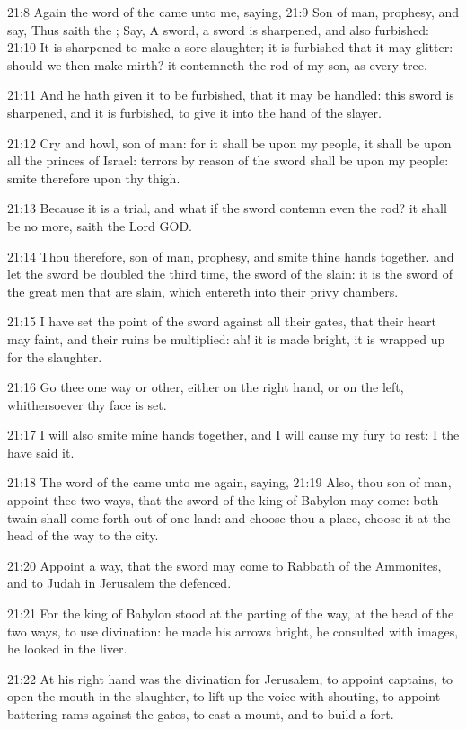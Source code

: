 21:8 Again the word of the \LORD came unto me, saying, 21:9 Son of man,
prophesy, and say, Thus saith the \LORD; Say, A sword, a sword is
sharpened, and also furbished: 21:10 It is sharpened to make a sore
slaughter; it is furbished that it may glitter: should we then make
mirth? it contemneth the rod of my son, as every tree.

21:11 And he hath given it to be furbished, that it may be handled:
this sword is sharpened, and it is furbished, to give it into the hand
of the slayer.

21:12 Cry and howl, son of man: for it shall be upon my people, it
shall be upon all the princes of Israel: terrors by reason of the
sword shall be upon my people: smite therefore upon thy thigh.

21:13 Because it is a trial, and what if the sword contemn even the
rod?  it shall be no more, saith the Lord GOD.

21:14 Thou therefore, son of man, prophesy, and smite thine hands
together. and let the sword be doubled the third time, the sword of
the slain: it is the sword of the great men that are slain, which
entereth into their privy chambers.

21:15 I have set the point of the sword against all their gates, that
their heart may faint, and their ruins be multiplied: ah! it is made
bright, it is wrapped up for the slaughter.

21:16 Go thee one way or other, either on the right hand, or on the
left, whithersoever thy face is set.

21:17 I will also smite mine hands together, and I will cause my fury
to rest: I the \LORD have said it.

21:18 The word of the \LORD came unto me again, saying, 21:19 Also,
thou son of man, appoint thee two ways, that the sword of the king of
Babylon may come: both twain shall come forth out of one land: and
choose thou a place, choose it at the head of the way to the city.

21:20 Appoint a way, that the sword may come to Rabbath of the
Ammonites, and to Judah in Jerusalem the defenced.

21:21 For the king of Babylon stood at the parting of the way, at the
head of the two ways, to use divination: he made his arrows bright, he
consulted with images, he looked in the liver.

21:22 At his right hand was the divination for Jerusalem, to appoint
captains, to open the mouth in the slaughter, to lift up the voice
with shouting, to appoint battering rams against the gates, to cast a
mount, and to build a fort.


